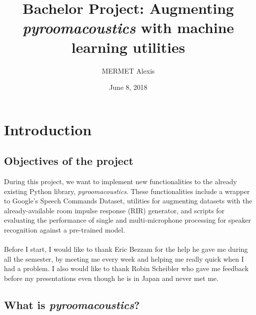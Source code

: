 \documentclass[11pt,a4paper,titlepage]{report}
\author{MERMET Alexis}
\title{Bachelor Project: Augmenting \textit{pyroomacoustics} with machine learning utilities}
\date{June 8, 2018}
\begin{document}
\maketitle
\tableofcontents
\newpage
\chapter{Introduction}
\section{Objectives of the project}
\hspace*{0.6cm}
During this project, we want to implement new functionalities to the already existing Python library, \textit{pyroomacoustics}. These functionalities include a wrapper to Google's Speech Commands Dataset, utilities for augmenting  datasets with the already-available room impulse response (RIR) generator, and scripts for evaluating the performance of single and multi-microphone processing for speaker recognition against a pre-trained model.\\
\\
\hspace*{0.6cm}
Before I start, I would like to thank Eric Bezzam for the help he gave me during all the semester, by meeting me every week and helping me really quick when I had a problem.
I also would like to thank Robin Scheibler who gave me feedback before my presentations even though he is in Japan and never met me.


\section{What is \textit{pyroomacoustics}?}
\end{document}
